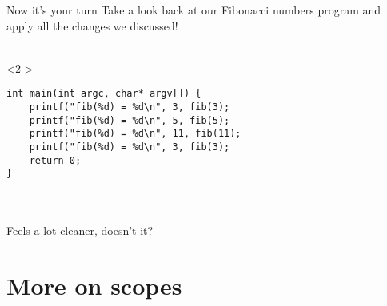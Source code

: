 \begin{frame}[fragile]{Now it's your turn}
	Take a look back at our Fibonacci numbers program and apply all the changes we discussed! \ \\ \ \\
	\begin{uncoverenv}<2->
		\begin{lstlisting}
int main(int argc, char* argv[]) {
	printf("fib(%d) = %d\n", 3, fib(3);
	printf("fib(%d) = %d\n", 5, fib(5);
	printf("fib(%d) = %d\n", 11, fib(11);
	printf("fib(%d) = %d\n", 3, fib(3);
	return 0;
}
\end{lstlisting} \ \\ \ \\
		Feels a lot cleaner, doesn't it?
	\end{uncoverenv}
\end{frame}
\section{More on scopes}
